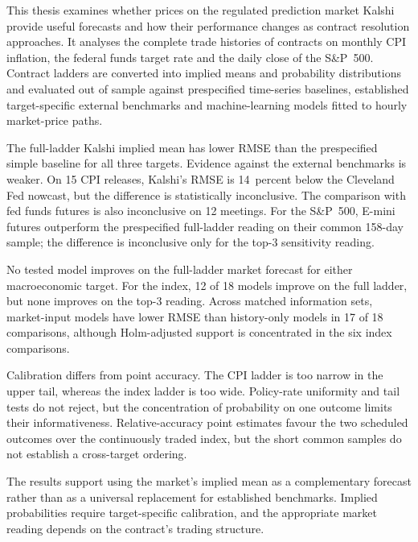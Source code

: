\documentclass[12pt,a4paper]{report}
\begin{document}
This thesis examines whether prices on the regulated prediction market Kalshi
provide useful forecasts and how their performance changes as contract
resolution approaches. It analyses the complete trade histories of contracts
on monthly CPI inflation, the federal funds target rate and the daily close of
the S\&P~500. Contract ladders are converted into implied means and probability
distributions and evaluated out of sample against prespecified time-series
baselines, established target-specific external benchmarks and machine-learning
models fitted to hourly market-price paths.

The full-ladder Kalshi implied mean has lower RMSE than the prespecified simple
baseline for all three targets. Evidence against the external benchmarks is
weaker. On 15 CPI releases, Kalshi's RMSE is 14~percent below the Cleveland Fed
nowcast, but the difference is statistically inconclusive. The comparison with
fed funds futures is also inconclusive on 12 meetings. For the S\&P~500, E-mini
futures outperform the prespecified full-ladder reading on their common
158-day sample; the difference is inconclusive only for the top-3 sensitivity
reading.

No tested model improves on the full-ladder market forecast for either
macroeconomic target. For the index, 12 of 18 models improve on the full ladder,
but none improves on the top-3 reading. Across matched information sets,
market-input models have lower RMSE than history-only models in 17 of 18
comparisons, although Holm-adjusted support is concentrated in the six index
comparisons.

Calibration differs from point accuracy. The CPI ladder is too narrow in the
upper tail, whereas the index ladder is too wide. Policy-rate uniformity and
tail tests do not reject, but the concentration of probability on one outcome
limits their informativeness. Relative-accuracy point estimates favour the two
scheduled outcomes over the continuously traded index, but the short common
samples do not establish a cross-target ordering.

The results support using the market's implied mean as a complementary forecast
rather than as a universal replacement for established benchmarks. Implied
probabilities require target-specific calibration, and the appropriate market
reading depends on the contract's trading structure.
 
\clearpage
\tableofcontents
\clearpage
\listoftables
{}
\clearpage
\listoffigures
{}
\end{document}
